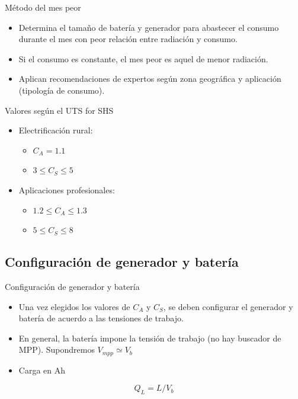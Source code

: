 \documentclass[xcolor={usenames,svgnames,dvipsnames}]{beamer}
\begin{document}
\begin{frame}[label={sec:org1826064}]{Método del mes peor}
\begin{itemize}
\item Determina el tamaño de batería y generador para abastecer el consumo \alert{durante el mes con peor relación entre radiación y consumo}.
\item Si el consumo es constante, el mes peor es aquel de menor radiación.
\item Aplican recomendaciones de expertos según zona geográfica y aplicación (tipología de consumo).
\end{itemize}

\begin{block}{Valores según el UTS for SHS}
\begin{itemize}
\item Electrificación rural:

\begin{itemize}
\item \(C_{A}=1.1\)

\item \(3\leq C_{S}\leq5\)
\end{itemize}

\item Aplicaciones profesionales:

\begin{itemize}
\item \(1.2\leq C_{A}\leq1.3\)

\item \(5\leq C_{S}\leq8\)
\end{itemize}
\end{itemize}
\end{block}
\end{frame}

\subsection{Configuración de generador y batería}
\label{sec:orgbc45554}
\begin{frame}[label={sec:orgb8d8fe1}]{Configuración de generador y batería}
\begin{itemize}
\item Una vez elegidos los valores de \(C_{A}\) y \(C_{S}\), se deben
configurar el generador y batería de acuerdo a las tensiones de
trabajo.

\item En general, la batería impone la tensión de trabajo (no hay buscador
de MPP). Supondremos \(V_{mpp} \simeq V_{b}\)

\item Carga en Ah
\end{itemize}
\[
\boxed{Q_L = L / V_b}
\]
\end{frame}
\end{document}
